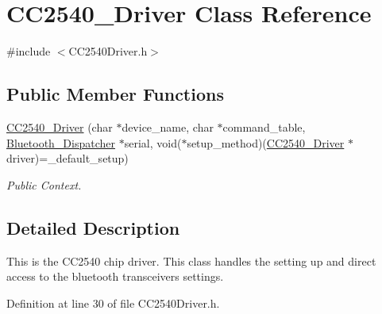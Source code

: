 \hypertarget{class_c_c2540___driver}{\section{\-C\-C2540\-\_\-\-Driver \-Class \-Reference}
\label{class_c_c2540___driver}
}


{\ttfamily \#include $<$\-C\-C2540\-Driver.\-h$>$}

\subsection*{\-Public \-Member \-Functions}
\begin{DoxyCompactItemize}
\item 
\hyperlink{class_c_c2540___driver_a7563aaba9c7b28c564b2f67e837a5682}{\-C\-C2540\-\_\-\-Driver} (char $\ast$device\-\_\-name, char $\ast$command\-\_\-table, \hyperlink{class_bluetooth___dispatcher}{\-Bluetooth\-\_\-\-Dispatcher} $\ast$serial, void($\ast$setup\-\_\-method)(\hyperlink{class_c_c2540___driver}{\-C\-C2540\-\_\-\-Driver} $\ast$driver)=\-\_\-default\-\_\-setup)
\begin{DoxyCompactList}\small\item\em \-Public \-Context. \end{DoxyCompactList}\end{DoxyCompactItemize}


\subsection{\-Detailed \-Description}
\-This is the \-C\-C2540 chip driver. \-This class handles the setting up and direct access to the bluetooth transceivers settings. 

\-Definition at line 30 of file \-C\-C2540\-Driver.\-h.



